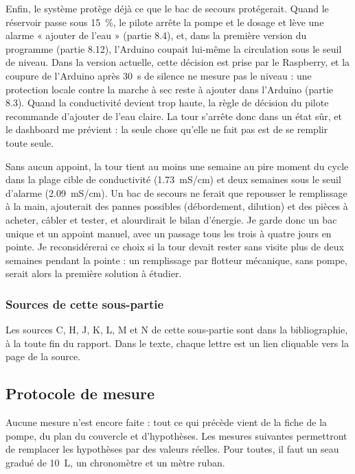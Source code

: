 Enfin, le système protège déjà ce que le bac de secours protégerait. Quand le réservoir passe sous \qty{15}{\percent}, le pilote arrête la pompe et le dosage et lève une alarme « ajouter de l'eau » (partie 8.4), et, dans la première version du programme (partie 8.12), l'Arduino coupait lui-même la circulation sous le seuil de niveau. Dans la version actuelle, cette décision est prise par le Raspberry, et la coupure de l'Arduino après \qty{30}{s} de silence ne mesure pas le niveau : une protection locale contre la marche à sec reste à ajouter dans l'Arduino (partie 8.3). Quand la conductivité devient trop haute, la règle de décision du pilote recommande d'ajouter de l'eau claire. La tour s'arrête donc dans un état sûr, et le dashboard me prévient : la seule chose qu'elle ne fait pas est de se remplir toute seule.

\begin{aretenir}
Sans aucun appoint, la tour tient au moins une semaine au pire moment du cycle dans la plage cible de conductivité (\qty{1,73}{mS/cm}) et deux semaines sous le seuil d'alarme (\qty{2,09}{mS/cm}). Un bac de secours ne ferait que repousser le remplissage à la main, ajouterait des pannes possibles (débordement, dilution) et des pièces à acheter, câbler et tester, et alourdirait le bilan d'énergie. Je garde donc un bac unique et un appoint manuel, avec un passage tous les trois à quatre jours en pointe. Je reconsidérerai ce choix si la tour devait rester sans visite plus de deux semaines pendant la pointe : un remplissage par flotteur mécanique, sans pompe, serait alors la première solution à étudier.
\end{aretenir}

\subsubsection*{Sources de cette sous-partie}

Les sources C, H, J, K, L, M et N de cette sous-partie sont dans la bibliographie, à la toute fin du rapport. Dans le texte, chaque lettre est un lien cliquable vers la page de la source.

\subsection{Protocole de mesure}

Aucune mesure n'est encore faite : tout ce qui précède vient de la fiche de la pompe, du plan du couvercle et d'hypothèses. Les mesures suivantes permettront de remplacer les hypothèses par des valeurs réelles. Pour toutes, il faut un seau gradué de \qty{10}{L}, un chronomètre et un mètre ruban.


